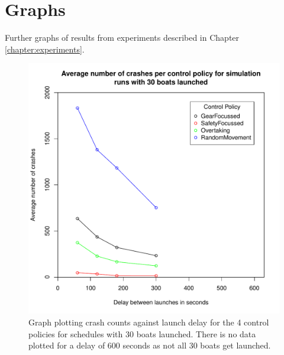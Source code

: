 \chapter{Graphs} \label{appendix:graphs}
Further graphs of results from experiments described in Chapter \ref{chapter:experiments}.

\begin{figure}
\begin{center}
  \includegraphics[scale=0.8]{"images/graphs/Average number of crashes per control policy for simulation runs with 30 boats launched"}
  \caption{Graph plotting crash counts against launch delay for the 4 control policies for schedules with 30 boats launched. There is no data plotted for a delay of 600 seconds as not all 30 boats get launched.}
  \label{appendix:graphs:crash_counts_30_launches}
\end{center}
\end{figure}

